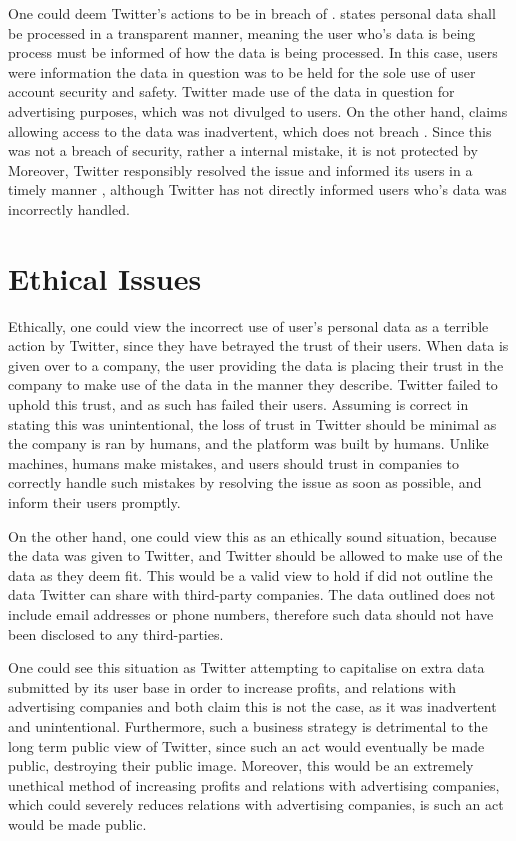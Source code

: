\documentclass[a4paper, 11pt]{article}
\begin{document}
One could deem Twitter's actions to be in breach of \textcite{noauthor_regulation_2016}.
\textcite{noauthor_regulation_2016} states personal data shall be processed in a transparent manner, meaning the user who's data is being process must be informed of how the data is being processed.
In this case, users were information the data in question was to be held for the sole use of user account security and safety.
Twitter made use of the data in question for advertising purposes, which was not divulged to users.
On the other hand, \textcite{support_personal_2019} claims allowing access to the data was inadvertent, which does not breach \textcite{noauthor_regulation_2016}.
Since this was not a breach of security, rather a internal mistake, it is not protected by \textcite{noauthor_regulation_2016}
Moreover, Twitter responsibly resolved the issue and informed its users in a timely manner \parencite{support_twitter_2019}, although Twitter has not directly informed users who's data was incorrectly handled.

\section{Ethical Issues}
Ethically, one could view the incorrect use of user's personal data as a terrible action by Twitter, since they have betrayed the trust of their users.
When data is given over to a company, the user providing the data is placing their trust in the company to make use of the data in the manner they describe.
Twitter failed to uphold this trust, and as such has failed their users.
Assuming \textcite{support_twitter_2019} is correct in stating this was unintentional, the loss of trust in Twitter should be minimal as the company is ran by humans, and the platform was built by humans.
Unlike machines, humans make mistakes, and users should trust in companies to correctly handle such mistakes by resolving the issue as soon as possible, and inform their users promptly.

On the other hand, one could view this as an ethically sound situation, because the data was given to Twitter, and Twitter should be allowed to make use of the data as they deem fit.
This would be a valid view to hold if \textcite{twitter_privacy_2018} did not outline the data Twitter can share with third-party companies.
The data outlined does not include email addresses or phone numbers, therefore such data should not have been disclosed to any third-parties.

One could see this situation as Twitter attempting to capitalise on extra data submitted by its user base in order to increase profits, and relations with advertising companies
\textcite{support_personal_2019} and \textcite{support_twitter_2019} both claim this is not the case, as it was inadvertent and unintentional.
Furthermore, such a business strategy is detrimental to the long term public view of Twitter, since such an act would eventually be made public, destroying their public image.
Moreover, this would be an extremely unethical method of increasing profits and relations with advertising companies, which could severely reduces relations with advertising companies, is such an act would be made public.
\end{document}
